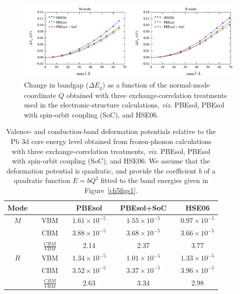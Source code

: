  
\begin{figure}[]
\includegraphics[width=\textwidth]{figures/ch5/fig_s4.png} 
\caption[Bandgap deformation potential at three levels of theory]{\label{Egtheory}
Change in bandgap ($\Delta E_\mathrm{g}$) as a function of the normal-mode coordinate $Q$ obtained with three exchange-correlation treatments used in the electronic-structure calculations, \textit{viz.} PBEsol, PBEsol with spin-orbit coupling (SoC), and HSE06.
}
\end{figure}

\begin{table}\centering
\caption[Valence- and conduction-band deformation potentials]{
Valence- and conduction-band deformation potentials relative to the Pb 3d core energy level obtained from frozen-phonon calculations with three exchange-correlation treatments, \textit{viz.} PBEsol, PBEsol with spin-orbit coupling (SoC), and HSE06. We assume that the deformation potential is quadratic, and provide the coefficient $b$ of a quadratic function $E=bQ^2$ fitted to the band energies given in Figure\ \ref{ch5figs1}.
}
\begin{tabular}{ccccccccc} \label{ch5allxc} \\
\toprule
Mode & \hspace{5pt} & & \hspace{5pt} & PBEsol & \hspace{5pt} & PBEsol+SoC & \hspace{5pt} & HSE06 \\
\midrule
$M$ & & VBM & & $1.61 \times 10^{-5}$ & & $1.55 \times 10^{-5}$ & & $0.97 \times 10^{-5}$ \\
& & CBM & & $3.88 \times 10^{-5}$ & & $3.68 \times 10^{-5}$ & & $3.66 \times 10^{-5}$ \\ 
& & $\frac{CBM}{VBM}$ & & 2.14 &  & 2.37 & & 3.77  \vspace{5pt} \\

$R$ & & VBM & & $1.34 \times 10^{-5}$ & & $1.01 \times 10^{-5}$ & & $1.33 \times 10^{-5}$ \\
& & CBM & & $3.52 \times 10^{-5}$ & & $3.37 \times 10^{-5}$ & & $3.96 \times 10^{-5}$ \\
& & $\frac{CBM}{VBM}$ & & 2.63 & & 3.34 & & 2.98 \vspace{5pt} \\ 
\bottomrule
\end{tabular}
\end{table}

